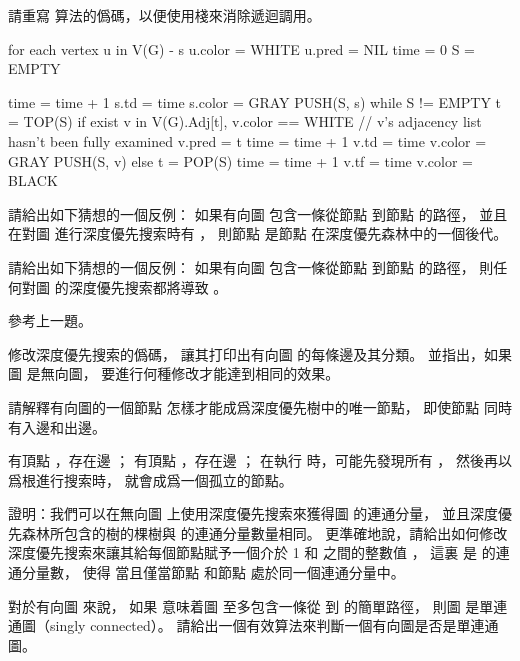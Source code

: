 \startANSWER
{}
\stopANSWER

\startEXERCISE
請重寫  算法的僞碼，以便使用棧來消除遞迴調用。
\stopEXERCISE

\startANSWER
{}
\startCLRS
for each vertex u in V(G) - {s}
	u.color = WHITE
	u.pred = NIL
time = 0
S = EMPTY

time = time + 1
s.td = time
s.color = GRAY
PUSH(S, s)
while S != EMPTY
	t = TOP(S)
	if exist v in V(G).Adj[t], v.color == WHITE	// v's adjacency list hasn't been fully examined
		v.pred = t
		time = time + 1
		v.td = time
		v.color = GRAY
		PUSH(S, v)
	else
		t = POP(S)
		time = time + 1
		v.tf = time
		v.color = BLACK
\stopCLRS
\stopANSWER

\startEXERCISE
請給出如下猜想的一個反例：
如果有向圖  包含一條從節點  到節點  的路徑，
並且在對圖  進行深度優先搜索時有 ，
則節點  是節點  在深度優先森林中的一個後代。
\stopEXERCISE

\startANSWER
\externalfigure[output/e22_3_8-1]
\stopANSWER

\startEXERCISE
請給出如下猜想的一個反例：
如果有向圖  包含一條從節點  到節點  的路徑，
則任何對圖  的深度優先搜索都將導致 。
\stopEXERCISE

\startANSWER
參考上一題。
\stopANSWER

\startEXERCISE
修改深度優先搜索的僞碼，
讓其打印出有向圖  的每條邊及其分類。
並指出，如果圖  是無向圖，
要進行何種修改才能達到相同的效果。
\stopEXERCISE

\startANSWER
{}
\stopANSWER

\startEXERCISE
請解釋有向圖的一個節點  怎樣才能成爲深度優先樹中的唯一節點，
即使節點  同時有入邊和出邊。
\stopEXERCISE

\startANSWER
有頂點 ，存在邊 ；
有頂點 ，存在邊 ；
在執行  時，可能先發現所有 ，
然後再以  爲根進行搜索時，  就會成爲一個孤立的節點。
\stopANSWER

\startEXERCISE
證明：我們可以在無向圖  上使用深度優先搜索來獲得圖  的連通分量，
並且深度優先森林所包含的樹的棵樹與  的連通分量數量相同。
更準確地說，請給出如何修改深度優先搜索來讓其給每個節點賦予一個介於 1 和  之間的整數值 ，
這裏  是  的連通分量數，
使得  當且僅當節點  和節點  處於同一個連通分量中。
\stopEXERCISE

\startANSWER
{}
\stopANSWER

\startEXERCISE\DIFFICULT
對於有向圖  來說，
如果  意味着圖  至多包含一條從  到  的簡單路徑，
則圖  是{\EMP 單連通圖}（singly connected）。
請給出一個有效算法來判斷一個有向圖是否是單連通圖。
\stopEXERCISE

\startANSWER
{}
\stopANSWER

\stopsection
